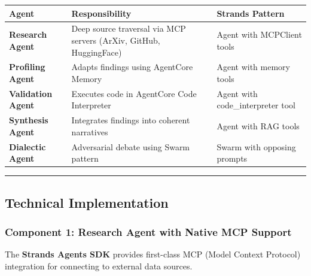 {\def\LTcaptype{none} %
\begin{longtable}[]{@{}
  >{\raggedright\arraybackslash}p{}
  >{\raggedright\arraybackslash}p{}
  >{\raggedright\arraybackslash}p{}@{}}
\toprule\noalign{}
\begin{minipage}[b]{\linewidth}\raggedright
Agent
\end{minipage} & \begin{minipage}[b]{\linewidth}\raggedright
Responsibility
\end{minipage} & \begin{minipage}[b]{\linewidth}\raggedright
Strands Pattern
\end{minipage} \\
\midrule\noalign{}
\endhead
\bottomrule\noalign{}
\endlastfoot
\textbf{Research Agent} & Deep source traversal via MCP servers (ArXiv,
GitHub, HuggingFace) & Agent with MCPClient tools \\
\textbf{Profiling Agent} & Adapts findings using AgentCore Memory &
Agent with memory tools \\
\textbf{Validation Agent} & Executes code in AgentCore Code Interpreter
& Agent with code\_interpreter tool \\
\textbf{Synthesis Agent} & Integrates findings into coherent narratives
& Agent with RAG tools \\
\textbf{Dialectic Agent} & Adversarial debate using Swarm pattern &
Swarm with opposing prompts \\
\end{longtable}
}

\begin{center}\rule{0.5\linewidth}{0.5pt}\end{center}

\subsection{Technical Implementation}\label{technical-implementation}

\subsubsection{Component 1: Research Agent with Native MCP
Support}\label{component-1-research-agent-with-native-mcp-support}

The \textbf{Strands Agents SDK} provides first-class MCP (Model Context
Protocol) integration for connecting to external data sources.

